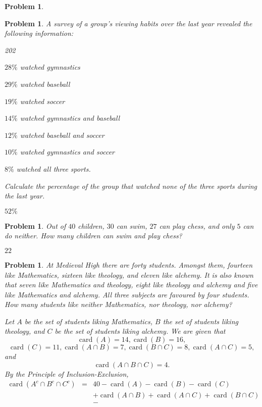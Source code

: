 \documentclass[11pt, openany]{book}
\theoremstyle{change} \theoremheaderfont{\blue\sffamily\bfseries}
\newtheorem{pro}[thm]{Problem}
\theoremstyle{nonumberplain} \theoremheaderfont{\sffamily\bfseries}
\newcommand{\í}{\'{\i}}
\def\card#1{\operatorname{card}\left(#1\right)}
\begin{document}
\begin{multicols}{2}
\begin{pro}
     \end{pro}
          \begin{pro}
A survey of a group's viewing habits over the last year revealed the
following information:
\begin{dingautolist}{202}
\item  $28\%$ watched gymnastics \item  $29\%$ watched baseball
\item $19\%$ watched soccer \item  $14\%$ watched gymnastics and
baseball \item $12\%$ watched baseball and soccer \item  $10\%$
watched gymnastics and soccer \item  $8\%$ watched all three sports.
\end{dingautolist}
Calculate the percentage of the group that watched none of the three
sports during the last year.
\begin{answer}
$52\%$
\end{answer}
    \end{pro}
           \begin{pro}
Out of $40$ children, $30$ can swim, $27$ can play chess, and only
$5$ can do neither. How many children can swim and play chess?
\begin{answer}$22$
\end{answer}
    \end{pro}
\begin{pro} At {\em Medieval High} there are forty students. Amongst
them, fourteen like Mathematics, sixteen like theology, and eleven
like alchemy. It is also known that seven like Mathematics and
theology, eight like theology and alchemy and five like Mathematics
and alchemy. All three subjects are favoured by four students. How
many students like neither Mathematics, nor theology, nor alchemy?
\begin{answer} Let $A$ be the set of students liking Mathematics, $B$ the set
of students liking theology, and $C$ be the set of students liking
alchemy. We are given that $$ \card{A} = 14, \card{B} = 16,$$ $$
\card{C} = 11, \card{A\cap B} = 7, \card{B\cap C} = 8, \card{A\cap
C} = 5,$$ and
$$ \card{A\cap B\cap C} = 4.$$By the Principle of Inclusion-Exclusion,
$$\begin{array}{lll} \card{ A^c \cap  B^c \cap  C^c}  &= &  40 - \card{A} - \card{B} - \card{C}\\
& &  + \card{A\cap B} + \card{A\cap C} + \card{B\cap C} \\ & &  -

\end{array}$$
\end{answer}
\end{pro}
\end{multicols}
\end{document}
